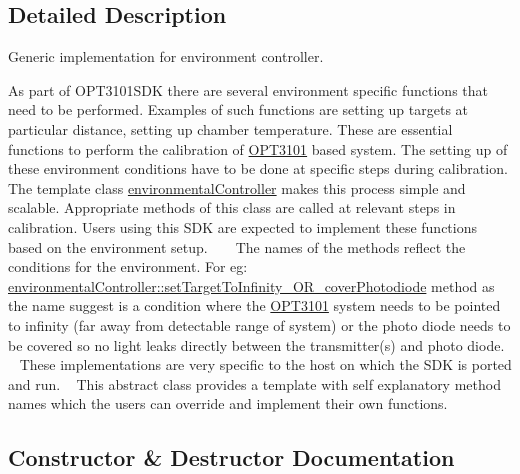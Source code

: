 \subsection{Detailed Description}
Generic implementation for environment controller. 

As part of O\+P\+T3101\+S\+DK there are several environment specific functions that need to be performed. Examples of such functions are setting up targets at particular distance, setting up chamber temperature. These are essential functions to perform the calibration of \mbox{\hyperlink{namespace_o_p_t3101}{O\+P\+T3101}} based system. The setting up of these environment conditions have to be done at specific steps during calibration. The template class \mbox{\hyperlink{classenvironmental_controller}{environmental\+Controller}} makes this process simple and scalable. Appropriate methods of this class are called at relevant steps in calibration. Users using this S\+DK are expected to implement these functions based on the environment setup. ~\newline
~\newline
 The names of the methods reflect the conditions for the environment. For eg\+: \mbox{\hyperlink{classenvironmental_controller_a8a1fb44efff232844f00de18e174d4ce}{environmental\+Controller\+::set\+Target\+To\+Infinity\+\_\+\+O\+R\+\_\+cover\+Photodiode}} method as the name suggest is a condition where the \mbox{\hyperlink{namespace_o_p_t3101}{O\+P\+T3101}} system needs to be pointed to infinity (far away from detectable range of system) or the photo diode needs to be covered so no light leaks directly between the transmitter(s) and photo diode. ~\newline
These implementations are very specific to the host on which the S\+DK is ported and run. ~\newline
 This abstract class provides a template with self explanatory method names which the users can override and implement their own functions. ~\newline
 

\subsection{Constructor \& Destructor Documentation}
\mbox{\label{classenvironmental_controller_a2dbb21c983ff11a07ef763fba57b2e76}} 
